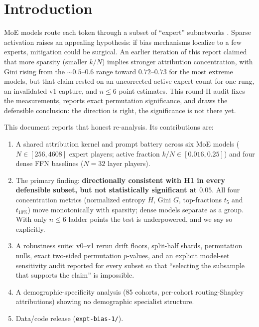 \documentclass[sigconf]{acmart}
\begin{document}

\maketitle

\section{Introduction}
\label{sec:intro}
MoE models route each token through a subset of ``expert'' subnetworks
\cite{shazeer2017,fedus2022,jiang2024,cai2024}. Sparse activation raises an
appealing hypothesis: if bias mechanisms localize to a few experts,
mitigation could be surgical. An earlier iteration of this report claimed
that more sparsity (smaller $k/N$) implies stronger attribution
concentration, with Gini rising from the $\sim 0.5$--$0.6$ range toward
$0.72$--$0.73$ for the most extreme models, but that claim rested on an
uncorrected active-expert count for one rung, an invalidated v1 capture, and
$n \le 6$ point estimates. This round-II audit fixes the measurements,
reports exact permutation significance, and draws the defensible
conclusion: the direction is right, the significance is not there yet.

This document reports that honest re-analysis. Its contributions are:
\begin{enumerate}
\item A shared attribution kernel and prompt battery across six MoE models
($N \in [256, 4608]$ expert players; active fraction $k/N \in [0.016, 0.25]$)
and four dense FFN baselines ($N = 32$ layer players).
\item The primary finding: \textbf{directionally consistent with H1 in
every defensible subset, but not statistically significant at $0.05$}.
All four concentration metrics (normalized entropy $H$, Gini $G$,
top-fractions $t_5$ and $t_{10\%}$) move monotonically with sparsity;
dense models separate as a group. With only $n \le 6$ ladder points the
test is underpowered, and we say so explicitly.
\item A robustness suite: v0--v1 rerun drift floors, split-half shards,
permutation nulls, exact two-sided permutation $p$-values, and an explicit
model-set sensitivity audit reported for every subset so that ``selecting
the subsample that supports the claim'' is impossible.
\item A demographic-specificity analysis (85 cohorts, per-cohort
routing-Shapley attributions) showing no demographic specialist structure.
\item Data/code release (\texttt{expt-bias-1/}).
\end{enumerate}
\end{document}
